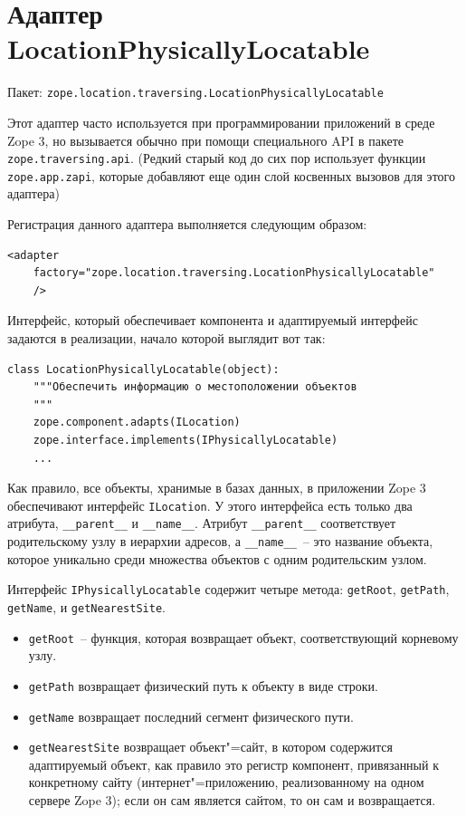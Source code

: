 \documentclass[a4paper,openany,twoside,final]{book}
\begin{document}
\section{Адаптер LocationPhysicallyLocatable%
  \label{locationphysicallylocatable}%
}

Пакет: \texttt{zope.location.traversing.LocationPhysicallyLocatable}

Этот адаптер часто используется при программировании приложений в среде Zope 3, но вызывается обычно при помощи специального API в пакете \texttt{zope.traversing.api}.  (Редкий старый код до сих пор использует функции \texttt{zope.app.zapi}, которые добавляют еще один слой косвенных вызовов для этого адаптера)

Регистрация данного адаптера выполняется следующим образом:

\begin{verbatim}
<adapter
    factory="zope.location.traversing.LocationPhysicallyLocatable"
    />
\end{verbatim}

Интерфейс, который обеспечивает компонента и адаптируемый интерфейс задаются в реализации, начало которой выглядит вот так:

\begin{verbatim}
class LocationPhysicallyLocatable(object):
    """Обеспечить информацию о местоположении объектов
    """
    zope.component.adapts(ILocation)
    zope.interface.implements(IPhysicallyLocatable)
    ...
\end{verbatim}

Как правило, все объекты, хранимые в базах данных, в приложении Zope 3 обеспечивают интерфейс \texttt{ILocation}.  У этого интерфейса есть только два атрибута, \texttt{\_\_parent\_\_} и \texttt{\_\_name\_\_}.  Атрибут \texttt{\_\_parent\_\_} соответствует родительскому узлу в иерархии адресов, а \texttt{\_\_name\_\_}~-- это название объекта, которое уникально среди множества объектов с одним родительским узлом.

Интерфейс \texttt{IPhysicallyLocatable} содержит четыре метода: \texttt{getRoot}, \texttt{getPath}, \texttt{getName}, и \texttt{getNearestSite}.

\begin{itemize}

\item \texttt{getRoot}~-- функция, которая возвращает объект, соответствующий корневому узлу.

\item \texttt{getPath} возвращает физический путь к объекту в виде строки.

\item \texttt{getName} возвращает последний сегмент физического пути.

\item \texttt{getNearestSite} возвращает объект"=сайт, в котором содержится адаптируемый объект, как правило это регистр компонент, привязанный к конкретному сайту (интернет"=приложению, реализованному на одном сервере Zope 3); если он сам является сайтом, то он сам и возвращается.

\end{itemize}
\end{document}
